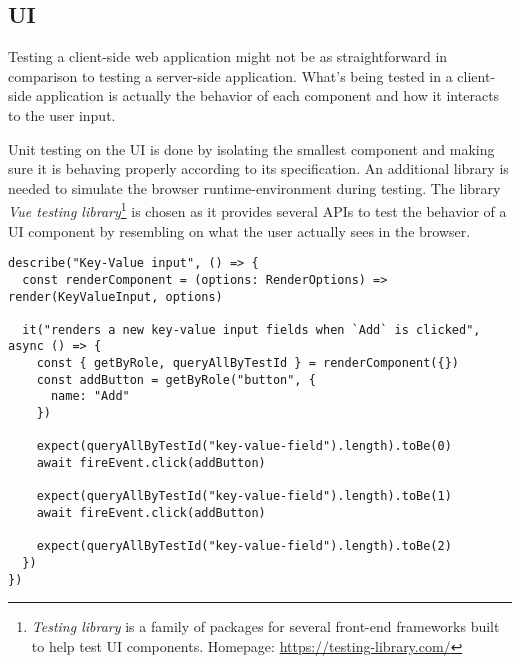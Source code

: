   \subsection{UI}

    Testing a client-side web application might not be as straightforward in comparison to testing a server-side application. What's being tested in a client-side application is actually the behavior of each component and how it interacts to the user input. 
    
    Unit testing on the UI is done by isolating the smallest component and making sure it is behaving properly according to its specification. An additional library is needed to simulate the browser runtime-environment during testing. The library \emph{Vue testing library}\footnote{\emph{Testing library} is a family of packages for several front-end frameworks built to help test UI components. Homepage: \url{https://testing-library.com/}} is chosen as it provides several APIs to test the behavior of a UI component by resembling on what the user actually sees in the browser. 

    \begin{lstlisting}[style=es6, caption={Example unit test of a UI component (TypeScript)}]
describe("Key-Value input", () => {
  const renderComponent = (options: RenderOptions) => render(KeyValueInput, options)
  
  it("renders a new key-value input fields when `Add` is clicked", async () => {
    const { getByRole, queryAllByTestId } = renderComponent({})
    const addButton = getByRole("button", {
      name: "Add" 
    })

    expect(queryAllByTestId("key-value-field").length).toBe(0)
    await fireEvent.click(addButton)

    expect(queryAllByTestId("key-value-field").length).toBe(1)
    await fireEvent.click(addButton)

    expect(queryAllByTestId("key-value-field").length).toBe(2)
  })
})
    \end{lstlisting}